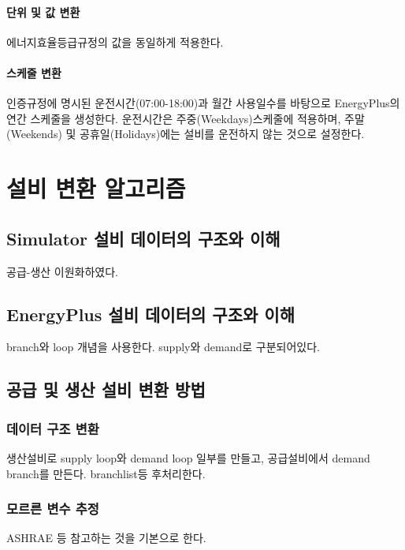 \paragraph{단위 및 값 변환} 에너지효율등급규정의 값을 동일하게 적용한다.
\paragraph{스케줄 변환} 인증규정에 명시된 운전시간(07:00-18:00)과 월간 사용일수를 바탕으로 EnergyPlus의 연간 스케줄을 생성한다. 운전시간은 주중(Weekdays)스케줄에 적용하며, 주말(Weekends) 및 공휴일(Holidays)에는 설비를 운전하지 않는 것으로 설정한다.



\section{설비 변환 알고리즘}
\subsection{Simulator 설비 데이터의 구조와 이해}
공급-생산 이원화하였다.

\subsection{EnergyPlus 설비 데이터의 구조와 이해}
branch와 loop 개념을 사용한다. supply와 demand로 구분되어있다.

\subsection{공급 및 생산 설비 변환 방법}
\subsubsection{데이터 구조 변환}
생산설비로 supply loop와 demand loop 일부를 만들고, 공급설비에서 demand branch를 만든다.
branchlist등 후처리한다.

\subsubsection{모르른 변수 추정}

ASHRAE 등 참고하는 것을 기본으로 한다.

